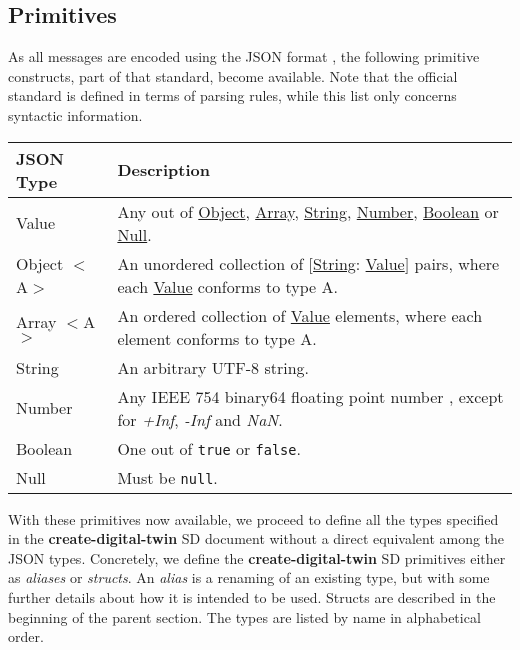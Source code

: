 \documentclass[a4paper]{arrowhead}
\newcommand{\pdef}[1]{{\textcolor{ArrowheadGrey}{#1 \label{sec:model:primitives:#1} \label{sec:model:primitives:#1s}}}}
\newcommand{\pref}[1]{{\textcolor{ArrowheadGrey}{\hyperref[sec:model:primitives:#1]{#1}}}}
\begin{document}
\subsection{Primitives}
\label{sec:model:primitives}

As all messages are encoded using the JSON format \cite{bray2014json}, the following primitive constructs, part of that standard, become available.
Note that the official standard is defined in terms of parsing rules, while this list only concerns syntactic information. 

\begin{table}[ht!]
\begin{tabularx}{\textwidth}{| p{3cm} | X |} \hline
\rowcolor{gray!33} JSON Type & Description \\ \hline
\pdef{Value}                 & Any out of \pref{Object}, \pref{Array}, \pref{String}, \pref{Number}, \pref{Boolean} or \pref{Null}. \\ \hline
\pdef{Object}$<$A$>$         & An unordered collection of $[$\pref{String}: \pref{Value}$]$ pairs, where each \pref{Value} conforms to type A. \\ \hline
\pdef{Array}$<$A$>$          & An ordered collection of \pref{Value} elements, where each element conforms to type A. \\ \hline
\pdef{String}                & An arbitrary UTF-8 string. \\ \hline
\pdef{Number}                & Any IEEE 754 binary64 floating point number \cite{cowlishaw2019floating}, except for \textit{+Inf}, \textit{-Inf} and \textit{NaN}. \\ \hline
\pdef{Boolean}               & One out of \texttt{true} or \texttt{false}. \\ \hline
\pdef{Null}                  & Must be \texttt{null}. \\ \hline
\end{tabularx}
\end{table}

With these primitives now available, we proceed to define all the types specified in the \textbf{create-digital-twin} SD document without a direct equivalent among the JSON types.
Concretely, we define the \textbf{create-digital-twin} SD primitives either as \textit{aliases} or \textit{structs}.
An \textit{alias} is a renaming of an existing type, but with some further details about how it is intended to be used.
Structs are described in the beginning of the parent section.
The types are listed by name in alphabetical order.
\end{document}
